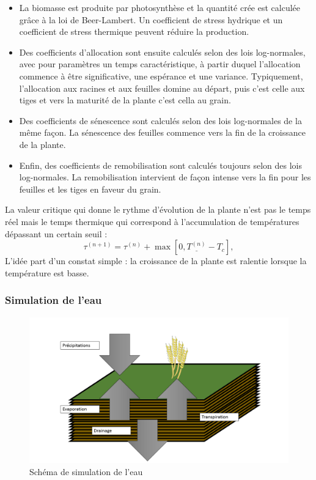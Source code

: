 \begin{itemize}

\item La biomasse est produite par photosynthèse et la quantité crée est calculée grâce à la loi de Beer-Lambert.  Un coefficient de stress hydrique et un coefficient de stress thermique peuvent réduire la production.

\item Des coefficients d'allocation sont ensuite calculés selon des lois log-normales, avec pour paramètres un temps caractéristique, à partir duquel l'allocation commence à être significative, une espérance et une variance. Typiquement, l'allocation aux racines et aux feuilles domine au départ, puis c'est celle aux tiges et vers la maturité de la plante c'est cella au grain.

\item Des coefficients de sénescence sont calculés selon des lois log-normales de la même façon. La sénescence des feuilles commence vers la fin de la croissance de la plante.

\item Enfin, des coefficients de remobilisation sont calculés toujours selon des lois log-normales. La remobilisation intervient de façon intense vers la fin pour les feuilles et les tiges en faveur du grain.

\end{itemize}

La valeur critique qui donne le rythme d'évolution de la plante n'est pas le temps réel mais le temps thermique qui correspond à l'accumulation de températures dépassant un certain seuil :
\[
\tau^{(n+1)} = \tau^{(n)} + \max[0, \underline{T^{(n)}} - T_c], 
\]
L'idée part d'un constat simple : la croissance de la plante est ralentie lorsque la température est basse.

\subsubsection{Simulation de l'eau}

\begin{figure}[H]

\begin{center}
 \includegraphics[scale = 0.42]{./img/waterSchema.png}
 \caption{Schéma de simulation de l'eau}
 \label{fig:waterModel}
\end{center}

\end{figure}

